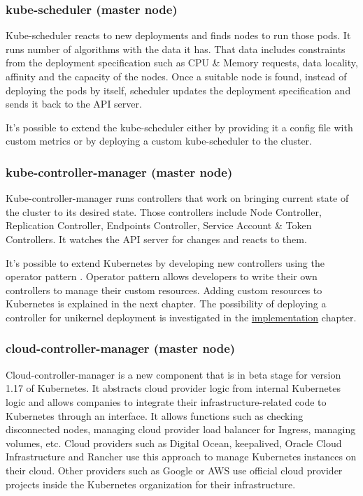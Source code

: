  \subsubsection*{kube-scheduler (master node)}
  Kube-scheduler reacts to new deployments and finds nodes to run those pods. It runs number of algorithms with the data it has. That data includes constraints from the deployment specification such as CPU \& Memory requests, data locality, affinity and the capacity of the nodes. Once a suitable node is found, instead of deploying the pods by itself, scheduler updates the deployment specification and sends it back to the API server.

  It's possible to extend the kube-scheduler either by providing it a config file with custom metrics or by deploying a custom kube-scheduler to the cluster.

  \subsubsection*{kube-controller-manager (master node)}
  Kube-controller-manager runs controllers that work on bringing current state of the cluster to its desired state. Those controllers include Node Controller, Replication Controller, Endpoints Controller, Service Account \& Token Controllers. It watches the API server for changes and reacts to them.


  It's possible to extend Kubernetes by developing new controllers using the operator pattern \cite{operatorpattern}. Operator pattern allows developers to write their own controllers to manage their custom resources. Adding custom resources to Kubernetes is explained in the next chapter. The possibility of deploying a controller for unikernel deployment is investigated in the \hyperref[chapter:implementation]{implementation} chapter.

  \subsubsection*{cloud-controller-manager (master node)}
  Cloud-controller-manager is a new component that is in beta stage for version 1.17 of Kubernetes. It abstracts cloud provider logic from internal Kubernetes logic and allows companies to integrate their infrastructure-related code to Kubernetes through an interface. It allows functions such as checking disconnected nodes, managing cloud provider load balancer for Ingress, managing volumes, etc. Cloud providers such as Digital Ocean, keepalived, Oracle Cloud Infrastructure and Rancher use this approach to manage Kubernetes instances on their cloud. Other providers such as Google or AWS use official cloud provider projects inside the Kubernetes organization for their infrastructure.
